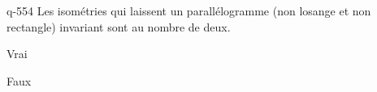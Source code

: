 \begin{truefalse}{q-554}
Les isométries qui laissent un parallélogramme (non losange et non rectangle) invariant sont au nombre de deux.
\item* Vrai
\item Faux
\end{truefalse}

